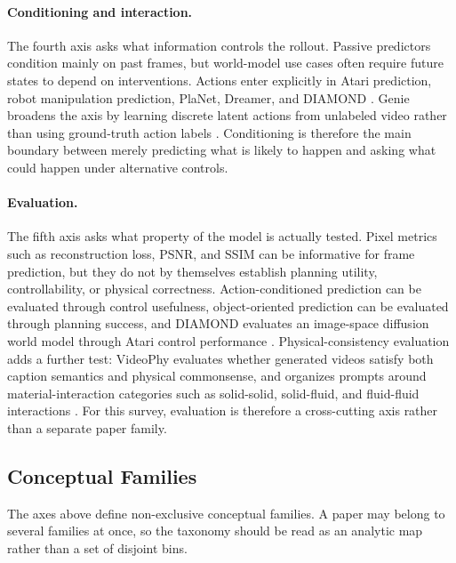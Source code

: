 \paragraph{Conditioning and interaction.}
The fourth axis asks what information controls the rollout. Passive predictors condition mainly on past frames, but world-model use cases often require future states to depend on interventions. Actions enter explicitly in Atari prediction, robot manipulation prediction, PlaNet, Dreamer, and DIAMOND \cite{oh2015_action_conditional_video_prediction_prov,finn2016_physical_interaction_video_prediction_prov,hafner2019_planet_prov,hafner2020_dreamer_prov,alonso2024_diamond_prov}. Genie broadens the axis by learning discrete latent actions from unlabeled video rather than using ground-truth action labels \cite{bruce2024_genie_prov}. Conditioning is therefore the main boundary between merely predicting what is likely to happen and asking what could happen under alternative controls.

\paragraph{Evaluation.}
The fifth axis asks what property of the model is actually tested. Pixel metrics such as reconstruction loss, PSNR, and SSIM can be informative for frame prediction, but they do not by themselves establish planning utility, controllability, or physical correctness. Action-conditioned prediction can be evaluated through control usefulness, object-oriented prediction can be evaluated through planning success, and DIAMOND evaluates an image-space diffusion world model through Atari control performance \cite{oh2015_action_conditional_video_prediction_prov,janner2019_o2p2_prov,alonso2024_diamond_prov}. Physical-consistency evaluation adds a further test: VideoPhy evaluates whether generated videos satisfy both caption semantics and physical commonsense, and organizes prompts around material-interaction categories such as solid-solid, solid-fluid, and fluid-fluid interactions \cite{bansal2025_videophy_prov}. For this survey, evaluation is therefore a cross-cutting axis rather than a separate paper family.

\subsection{Conceptual Families}

The axes above define non-exclusive conceptual families. A paper may belong to several families at once, so the taxonomy should be read as an analytic map rather than a set of disjoint bins.


